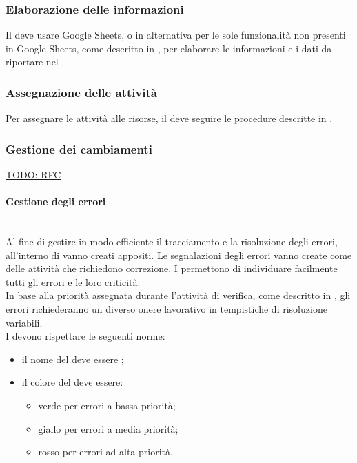 \subsubsection{Elaborazione delle informazioni}
Il \Responsabile{} deve usare Google Sheets, o in alternativa  per le sole funzionalità non presenti in Google Sheets, come descritto in , per elaborare le informazioni e i dati da riportare nel \PianoDiProgetto.

\subsubsection{Assegnazione delle attività}
Per assegnare le attività alle risorse, il \Responsabile{} deve seguire le procedure descritte in .

\subsubsection{Gestione dei cambiamenti}
\underline{TODO: RFC}

\paragraph{Gestione degli errori} \mbox{} \\
Al fine di gestire in modo efficiente il tracciamento e la risoluzione degli errori, all'interno di  vanno creati  appositi.
Le segnalazioni degli errori vanno create come  delle attività che richiedono correzione. I  permettono di individuare facilmente tutti gli errori e le loro criticità.\\
In base alla priorità assegnata durante l'attività di verifica, come descritto in \PianoDiQualifica, gli errori richiederanno un diverso onere lavorativo in tempistiche di risoluzione variabili.\\
I  devono rispettare le seguenti norme:
\begin{itemize}
	\item il nome del  deve essere ;
	\item il colore del  deve essere:
	\begin{itemize}
		\item verde per errori a bassa priorità;
		\item giallo per errori a media priorità;
		\item rosso per errori ad alta priorità.
	\end{itemize}
\end{itemize}

